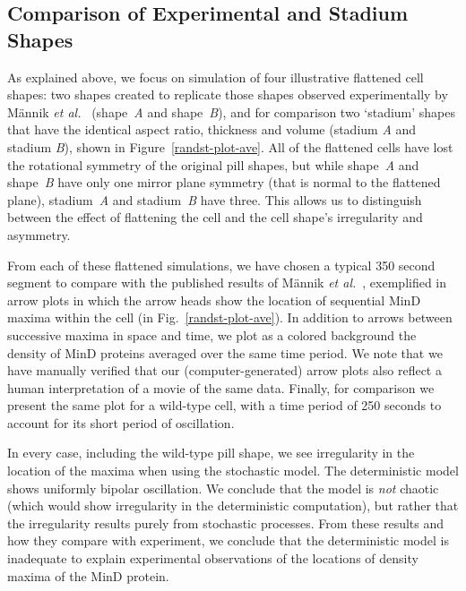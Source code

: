 \documentclass[10pt,letterpaper]{article}
\begin{document}
\subsection*{Comparison of Experimental and Stadium Shapes}
As explained above, we focus on simulation of four illustrative
flattened cell shapes: two shapes created to replicate those shapes
observed experimentally by M\"annik \emph{et
  al.}~\cite{mannik2012robustness} (shape~\emph{A} and
shape~\emph{B}), and for comparison two `stadium' shapes that have the
identical aspect ratio, thickness and volume (stadium \emph{A} and
stadium \emph{B}), shown in Figure~\ref{randst-plot-ave}.  All of the
flattened cells have lost the rotational symmetry of the original pill
shapes, but while shape~\emph{A} and shape~\emph{B} have only one
mirror plane symmetry (that is normal to the flattened plane),
stadium~\emph{A} and stadium~\emph{B} have three.  This allows us to
distinguish between the effect of flattening the cell and the cell
shape's irregularity and asymmetry.


From each of these flattened simulations, we have chosen a typical 350
second segment to compare with the published results of
M\"annik \emph{et al.}~\cite{mannik2012robustness}, exemplified in arrow plots in
which the arrow heads show the location of sequential MinD maxima
within the cell (in Fig.~\ref{randst-plot-ave}).  In addition to
arrows between successive maxima in space and time, we plot as a
colored background the density of MinD proteins averaged over the same
time period.  We note that we have manually verified that our
(computer-generated) arrow plots also reflect a human interpretation
of a movie of the same data.  Finally, for comparison we present the
same plot for a wild-type cell, with a time period of 250 seconds to
account for its short period of oscillation.

In every case, including the wild-type pill shape, we see irregularity
in the location of the maxima when using the stochastic model.  The
deterministic model shows uniformly bipolar oscillation.  We conclude
that the model is \emph{not} chaotic (which would show irregularity in
the deterministic computation), but rather that the irregularity
results purely from stochastic processes.  From these results and how
they compare with experiment, we conclude that the deterministic model
is inadequate to explain experimental observations of the locations of
density maxima of the MinD protein.
\end{document}
